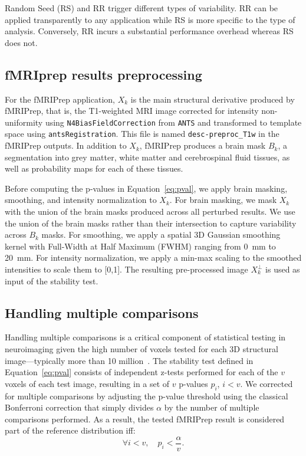 \documentclass[lettersize,journal]{IEEEtran}
\newcommand{\fmriprep}{fMRIPrep\xspace}
\newcommand{\fwhm}{\textsc{FWHM}}
\begin{document}
Random Seed (RS) and RR trigger different types of variability. RR can be applied transparently to any application while RS is more specific to the type of analysis. Conversely, RR incurs a substantial performance overhead whereas RS does not.

\subsection{fMRIprep results preprocessing}

For the \fmriprep application, $X_k$ is the main structural derivative produced by \fmriprep, that is, the T1-weighted MRI image corrected for intensity non-uniformity using \texttt{N4BiasFieldCorrection} from \texttt{ANTS} and transformed to template space using \texttt{antsRegistration}. This file is named \texttt{desc-preproc\_T1w} in the \fmriprep outputs. In addition to $X_k$, \fmriprep produces a brain mask $B_k$, a segmentation into grey matter, white matter and cerebrospinal fluid tissues, as well as probability maps for each of these tissues.

Before computing the p-values in Equation~\ref{eq:pval}, we apply brain masking, smoothing, and intensity normalization to $X_k$. For brain masking, we mask $X_k$ with the union of the brain masks produced across all perturbed results. We use the union of the brain masks rather than their intersection to capture variability across $B_k$ masks. For smoothing, we apply a spatial 3D Gaussian smoothing kernel with Full-Width at Half Maximum (\fwhm) ranging from 0~mm to 20~mm. For intensity normalization, we apply a min-max scaling to the smoothed intensities to scale them to [0,1].
The resulting pre-processed image $X_k^\perp$ is used as input of the stability test.


\subsection{Handling multiple comparisons}

Handling multiple comparisons is a critical component of statistical testing in neuroimaging given the high number of voxels tested for each 3D structural image---typically more than 10 million~\cite{NICHOLS2007246}. The stability test defined in Equation~\ref{eq:pval} consists of independent z-tests performed for each of the $v$ voxels of each test image, resulting in a set of $v$ p-values $p_i$, $i < v$. We corrected for multiple comparisons by adjusting the p-value threshold using the classical Bonferroni correction that simply divides $\alpha$ by the number of multiple comparisons performed. As a result, the tested \fmriprep result is considered part of the reference distribution iff:
\begin{equation}
    \label{eq:bonferroni}
    \forall i < v, \quad p_i < \frac{\alpha}{v}.
\end{equation}
\end{document}
